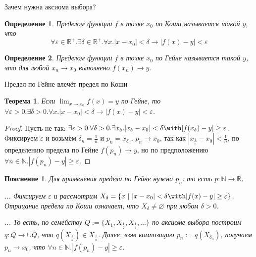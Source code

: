\documentclass[aspectratio=169]{beamer}
\newtheorem{thm}{Теорема}[section]
\newtheorem{dfn}{Определение}[section]
\newtheorem{snote}{Пояснение}[section]
\begin{document}
\begin{frame}{Зачем нужна аксиома выбора?}
\begin{dfn}Пределом функции $f$ в точке $x_0$ по \emph{Коши} называется такой $y$, что
$$\forall \varepsilon\in\mathbb{R}^+.\exists \delta\in\mathbb{R}^+.\forall x.|x-x_0| < \delta \rightarrow |f(x) - y| < \varepsilon$$
\end{dfn}

\vspace{-0.5cm}
\begin{dfn}Пределом функции $f$ в точке $x_0$ по \emph{Гейне} называется такой $y$, что
для любой $x_n \rightarrow x_0$ выполнено $f(x_n) \rightarrow y$.
\end{dfn}
\end{frame}

\begin{frame}{Предел по Гейне влечёт предел по Коши}
\begin{thm}
Если $\lim_{x \rightarrow x_0}f(x) = y$ по Гейне, то
$\forall \varepsilon>0.\exists \delta>0.\forall x.|x-x_0|<\delta \rightarrow |f(x)-y| < \varepsilon$.
\end{thm}

\begin{proof}
Пусть не так:
$\exists \varepsilon>0.\forall \delta>0.\exists x_\delta.|x_\delta-x_0|<\delta \with |f(x_\delta)-y| \ge \varepsilon$.
Фиксируем $\varepsilon$ и возьмём $\delta_n = \frac{1}{n}$ и $p_n = x_{\delta_n}$. 
$p_n \rightarrow x_0$, так как $|x_\frac{1}{n} - x_0| < \frac{1}{n}$, 
по определению предела по Гейне $f(p_n) \rightarrow y$, 
но по предположению $\forall n\in\mathbb{N}.|f(p_n) - y| \ge \varepsilon$.
\end{proof}\pause

\begin{snote}
Для применения предела по Гейне нужна $p_n$: то есть $p: \mathbb{N}\rightarrow\mathbb{R}$.
\pause

... %
Фиксируем $\varepsilon$ и рассмотрим $X_\delta = \{ x \ |\ |x-x_0| <\delta \with |f(x)-y| \ge \varepsilon\}$.
Отрицание предела по Коши означает, что $X_\delta \ne \varnothing$ при любом $\delta > 0$.
\pause

... То есть, по семейству $Q:=\{ X_1, X_\frac{1}{2}, X_\frac{1}{4}, \dots \}$ 
по аксиоме выбора построим $q: Q \rightarrow \cup Q$, что $q(X_\frac{1}{n}) \in X_\frac{1}{n}$.
Далее, взяв композицию $p_n := q(X_{\delta_n})$, получаем $p_n \rightarrow x_0$, что $\forall n\in\mathbb{N}.|f(p_n) - y| \ge \varepsilon$.
\end{snote}
\end{frame}
\end{document}
